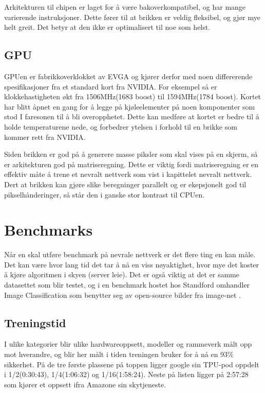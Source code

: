 Arkitekturen til chipen er laget for å være bakoverkompatibel, og har mange varierende instruksjoner. Dette fører til at brikken er veldig fleksibel, og gjør mye helt greit. Det betyr at den ikke er optimalisert til noe som helst.

\subsection{GPU}
GPUen er fabrikkoverklokket av EVGA og kjører derfor med noen differerende spesifikasjoner fra et standard kort fra NVIDIA. For eksempel så er klokkehastigheten økt fra 1506MHz(1683 boost) til 1594MHz(1784 boost). Kortet har blitt åpnet en gang for å legge på kjøleelementer på noen komponenter som stod I faresonen til å bli overopphetet. Dette kan medføre at kortet er bedre til å holde temperaturene nede, og forbedrer ytelsen i forhold til en brikke som kommer rett fra NVIDIA.

Siden brikken er god på å generere masse piksler som skal vises på en skjerm, så er arkitekturen god på matriseregning. Dette er viktig fordi matriseregning er en effektiv måte å trene et nevralt nettverk som vist i kapittelet nevralt nettverk. Dert at brikken kan gjøre slike beregninger parallelt og er ekepsjonelt god til pikselhånderinger, så står den i ganske stor kontrast til CPUen.

\newpage
\section{Benchmarks}

Når en skal utføre benchmark på nevrale nettverk er det flere ting en kan måle. Det kan være hvor lang tid det tar å nå en viss nøyaktighet, hvor mye det koster å kjøre algoritmen i skyen (server leie). Det er også viktig at det er samme datasettet som blir testet, og i en benchmark\cite{benchmark} hostet hos Standford omhandler Image Classification som benytter seg av open-source bilder fra image-net \cite{image-net}.

\subsection{Treningstid}
I ulike kategorier blir ulike hardwareoppsett, modeller og rammeverk målt opp mot hverandre, og blir her målt i tiden treningen bruker for å nå en 93\% sikkerhet. På de tre første plassene på toppen ligger google sin TPU-pod oppdelt i 1/2(0:30:43), 1/4(1:06:32) og 1/16(1:58:24). Neste på listen ligger på 2:57:28 som kjører et oppsett ifra Amazone sin skytjeneste. 

